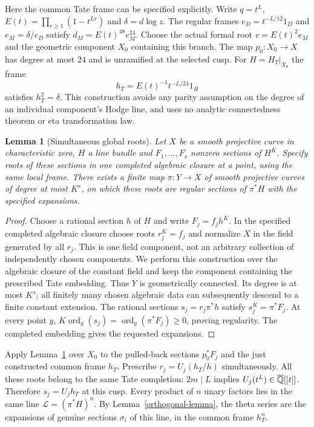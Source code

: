 \documentclass[11pt]{article}
\newtheorem{lemma}[theorem]{Lemma}
\theoremstyle{remark}\newtheorem{remark}[theorem]{Remark}
\DeclareMathOperator{\ord}{ord}\DeclareMathOperator{\diag}{diag}
\begin{document}
Here the common Tate frame can be specified explicitly. Write
$q=t^L$, $E(t)=\prod_{r\geq1}(1-t^{Lr})$ and $\delta=d\log z$.
The regular frames $e_D=t^{-L/12}1_D$ and $e_M=\delta/e_D$ satisfy
$d_M=E(t)^{48}e_M^{24}$. Choose the actual formal root
$v=E(t)^2e_M$ and the geometric component $X_0$ containing this branch.
The map $p_0:X_0\to X$ has degree at most $24$ and is unramified
at the selected cusp. For $H=H_T|_{X_0}$ the frame
\[
 h_T=E(t)^{-1}t^{-L/24}1_H
\]
satisfies $h_T^2=\delta$. This construction avoids any parity
assumption on the degree of an individual component's Hodge line,
and uses no analytic connectedness theorem or eta transformation law.

\begin{lemma}[Simultaneous global roots]\label{roots}
Let $X$ be a smooth projective curve in characteristic zero, $H$ a line
bundle and $F_1,\ldots,F_s$ nonzero sections of $H^K$.
Specify roots of these sections in one completed algebraic closure at a
point, using the same local frame. There exists a finite map $\pi:Y\to X$
of smooth projective curves of degree at most $K^s$, on which these roots
are regular sections of $\pi^*H$ with the specified expansions.
\end{lemma}
\begin{proof}
Choose a rational section $h$ of $H$ and write $F_j=f_jh^K$.
In the specified completed algebraic closure choose roots $r_j^K=f_j$
and normalize $X$ in the field generated by all $r_j$. This is one field
component, not an arbitrary collection of independently chosen components.
We perform this construction over the algebraic closure of the constant
field and keep the component containing the prescribed Tate embedding.
Thus $Y$ is geometrically connected. Its degree is at most $K^s$; all
finitely many chosen algebraic data can subsequently descend to a finite
constant extension. The rational sections $s_j=r_j\pi^*h$
satisfy $s_j^K=\pi^*F_j$. At every point $y$,
$K\ord_y(s_j)=\ord_y(\pi^*F_j)\geq0$, proving regularity.
The completed embedding gives the requested expansions.
\end{proof}

Apply Lemma~\ref{roots} over $X_0$ to the pulled-back sections
$p_0^*F_j$ and the just constructed common frame $h_T$.
Prescribe $r_j=U_j(h_T/h)$ simultaneously. All these roots belong to
the same Tate completion: $2m\mid L$ implies $U_j(t^L)\in\overline{\mathbb Q}[[t]]$. Therefore $s_j=U_jh_T$ at this cusp.
Every product of $n$ unary factors lies in the same line
$\mathcal L=(\pi^*H)^n$. By Lemma~\ref{orthogonal-lemma}, the theta
series are the expansions of genuine sections $\sigma_i$ of this line,
in the common frame $h_T^n$.
\end{document}
